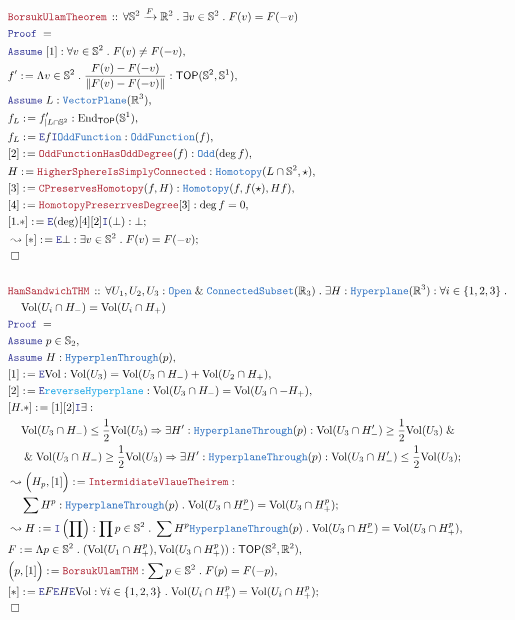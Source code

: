 \documentclass[12pt]{scrartcl}
\newcommand{\TYPE}[1]{\textcolor{NavyBlue}{\mathtt{#1}}}
\newcommand{\FUNC}[1]{\textcolor{Cerulean}{\mathtt{#1}}}
\newcommand{\LOGIC}[1]{\textcolor{Blue}{\mathtt{#1}}}
\newcommand{\THM}[1]{\textcolor{Maroon}{\mathtt{#1}}}
\renewcommand{\.}{\; . \;}
\newcommand{\de}{: \kern 0.1pc =}
\newcommand{\Act}[1]{\left( #1 \right)}
\newcommand{\Theorem}[2]{& \THM{#1} \, :: \, #2 \\ & \Proof = \\ }
\newcommand{\NewLine}{\\ & \kern 1pc}
\newcommand{\Page}[1]{ \begin{align*} #1 \end{align*}   }
\renewcommand{\And}{\; \& \;}
\newcommand{\Imply}{\Rightarrow}
\newcommand{\Intro}{\LOGIC{I}}
\newcommand{\Elim}{\LOGIC{E}}
\newcommand{\Reals}{\mathbb{R} }
\newcommand{\Sphere}{\mathbb{S}}
\newcommand{\End}{\mathrm{End}}
\newcommand{\Arrow}{\xrightarrow}
\newcommand{\Say}[3]{& #1 \de #2 : #3, \\}
\newcommand{\Conclude}[3]{& #1 \de #2 : #3; \\}
\newcommand{\Derive}[3]{& \leadsto #1 \de #2 : #3, \\}
\newcommand{\DeriveConclude}[3]{& \leadsto #1 \de #2 : #3 ; \\}
\newcommand{\Assume}[2]{& \LOGIC{Assume} \; #1 : #2, \\}
\newcommand{\AssumeIn}[2]{& \LOGIC{Assume} \; #1 \in #2, \\}
\newcommand{\QED}{\; \square}
\newcommand{\EndProof}{& \QED \\}
\newcommand{\Proof}{\LOGIC{Proof} \; }
\newcommand{\TOP}{\mathsf{TOP}}
\begin{document}
\Page{
	\Theorem{BorsukUlamTheorem}
	{
		\forall \Sphere^2 \Arrow{F} \Reals^2 \.
		\exists v \in \Sphere^2 \. F(v) = F(-v)
	}
	\Assume{[1]}{\forall v \in \Sphere^2 \. F(v) \neq F(-v)  }
	\Say{f'}{
		\Lambda v \in  \Sphere^2 \. \frac{F(v) - F(-v)}{\| F(v) - F(-v)\|}
	}
	{
		\TOP(\Sphere^2,\Sphere^1)
	}
	\Assume{L}{\TYPE{VectorPlane}(\Reals^3)}
	\Say{f_L}{f'_{|L \cap \Sphere^2}}{\End_{\TOP}(\Sphere^1)}
	\Say{f_L}{\Elim f \Intro \TYPE{OddFunction}}{\TYPE{OddFunction}(f)} 
	\Say{[2]}{\THM{OddFunctionHasOddDegree}(f)}{\TYPE{Odd}(\deg f) }
	\Say{H}{\THM{HigherSphereIsSimplyConnected}}{\TYPE{Homotopy}( L \cap \Sphere^2, \star  )}
	\Say{[3]}{\THM{CPreservesHomotopy}(f,H)}{\TYPE{Homotopy}(f,f(\star),Hf)}
	\Say{[4]}{\THM{HomotopyPreserrvesDegree}[3]}{\deg f = 0}
	\Conclude{[1.*]}{\Elim(\deg)[4][2]\Intro(\bot)}{\bot}
	\DeriveConclude{[*]}{\Elim \bot}{\exists v \in \Sphere^2 \. F(v) = F(-v)}
	\EndProof
	\\
	\Theorem{HamSandwichTHM}
	{
		\forall U_1,U_2,U_3 : \TYPE{Open} \And \TYPE{ConnectedSubset}(\Reals_3) \.
		\exists H : \TYPE{Hyperplane}(\Reals^3) :
		\forall i \in \{1,2,3\} \.
		\NewLine
		\mathrm{Vol}(U_i \cap H_-) = \mathrm{Vol}(U_i \cap H_+)
	}
	\AssumeIn{p}{\Sphere_2}
	\Assume{H}{\TYPE{HyperplenThrough}(p)}
	\Say{[1]}{\Elim \mathrm{Vol}}{ \mathrm{Vol}(U_3) = \mathrm{Vol}(U_3 \cap H_-) + \mathrm{Vol}(U_2 \cap H_+)  }
	\Say{[2]}{\Elim \FUNC{reverseHyperplane}}{ \mathrm{Vol}(U_3 \cap H_-) = \mathrm{Vol}(U_3 \cap -H_+)  }
	\Conclude{[H.*]}{[1][2]\Intro \exists}{ \NewLine 
		\mathrm{Vol}(U_3 \cap H_-) \le \frac{1}{2}\mathrm{Vol}(U_3) 
		\Imply 
		\exists H' : \TYPE{HyperplaneThrough}(p) :
		\mathrm{Vol}(U_3 \cap H'_-) \ge \frac{1}{2}\mathrm{Vol}(U_3) 
		\And \NewLine \And
		\mathrm{Vol}(U_3 \cap H_-) \ge \frac{1}{2}\mathrm{Vol}(U_3) 
		\Imply 
		\exists H' : \TYPE{HyperplaneThrough}(p) :
		\mathrm{Vol}(U_3 \cap H'_-) \le \frac{1}{2}\mathrm{Vol}(U_3) 	
	}
	\DeriveConclude{\Big(H_p,[1]\Big)}{\THM{IntermidiateVlaueTheirem}}{
		\NewLine
		\sum H^p : \TYPE{HyperplaneThrough}(p) \. 
		\mathrm{Vol}(U_3 \cap H_-^p) = \mathrm{Vol}(U_3 \cap H_+^p)
	}
	\Derive{H}{\Intro\Act{\prod}}
	{
		\prod p \in \Sphere^2 \. \sum H^p \TYPE{HyperplaneThrough}(p) \.
		\mathrm{Vol}(U_3 \cap H_-^p) = \mathrm{Vol}(U_3 \cap H_+^p)
	}
	\Say{F}{\Lambda p \in \Sphere^2 \. (\mathrm{Vol}(U_1 \cap H^p_+),\mathrm{Vol}(U_3\cap H^p_+))}
	{
		\TOP(\Sphere^2,\Reals^2)
	}
	\Say{\Big(p,[1]\Big)}{\THM{BorsukUlamTHM}}
	{
		\sum p \in \Sphere^2 \.
		F(p) = F(-p)
	}
	\Conclude{[*]}{\Elim F \Elim H \Elim \mathrm{Vol}}
	{
		\forall i \in \{1,2,3\} \. 
		\mathrm{Vol}(U_i \cap H^p_+) = \mathrm{Vol}(U_i \cap H^p_+)
	}
	\EndProof
}
\newpage
\end{document}
